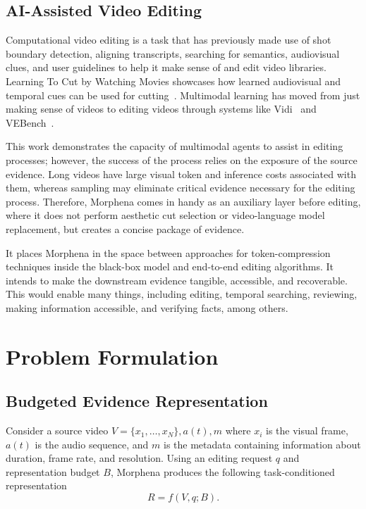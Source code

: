 \documentclass[conference]{IEEEtran}
\begin{document}
\subsection{AI-Assisted Video Editing}

Computational video editing is a task that has previously made use of shot boundary detection, aligning transcripts, searching for semantics, audiovisual clues, and user guidelines to help it make sense of and edit video libraries. Learning To Cut by Watching Movies showcases how learned audiovisual and temporal cues can be used for cutting~\cite{pardo2021learningtocut}. Multimodal learning has moved from just making sense of videos to editing videos through systems like Vidi~\cite{vidi2025} and VEBench~\cite{deng2026vebench}.

This work demonstrates the capacity of multimodal agents to assist in editing processes; however, the success of the process relies on the exposure of the source evidence. Long videos have large visual token and inference costs associated with them, whereas sampling may eliminate critical evidence necessary for the editing process. Therefore, Morphena comes in handy as an auxiliary layer before editing, where it does not perform aesthetic cut selection or video-language model replacement, but creates a concise package of evidence.

It places Morphena in the space between approaches for token-compression techniques inside the black-box model and end-to-end editing algorithms. It intends to make the downstream evidence tangible, accessible, and recoverable. This would enable many things, including editing, temporal searching, reviewing, making information accessible, and verifying facts, among others.


\section{Problem Formulation}

\subsection{Budgeted Evidence Representation}

Consider a source video $V=\{x_1,\ldots,x_N\},a(t),m$ where $x_i$ is the visual frame, $a(t)$ is the audio sequence, and $m$ is the metadata containing information about duration, frame rate, and resolution. Using an editing request $q$ and representation budget $B$, Morphena produces the following task-conditioned representation
\begin{equation}
R=f(V,q;B).
\label{eq:representation}
\end{equation}
\end{document}
